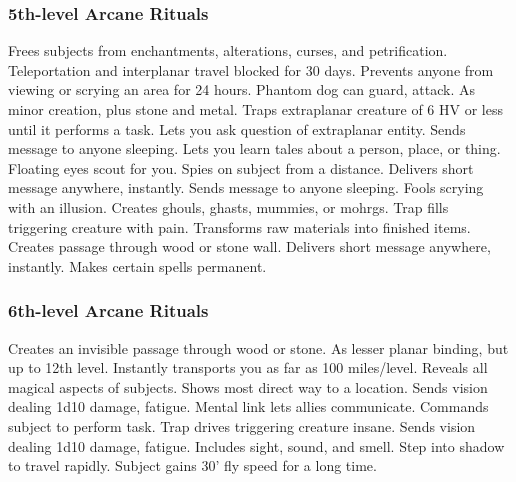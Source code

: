 \subsubsection{5th-level Arcane Rituals}
\begin{rituallist}
     Frees subjects from enchantments, alterations, curses, and petrification.
     Teleportation and interplanar travel blocked for 30 days.
     Prevents anyone from viewing or scrying an area for 24 hours.
     Phantom dog can guard, attack.
     As minor creation, plus stone and metal.
     Traps extraplanar creature of 6 HV or less until it performs a task.
     Lets you ask question of extraplanar entity.
     Sends message to anyone sleeping.
    \F Lets you learn tales about a person, place, or thing.
     Floating eyes scout for you.
    \F Spies on subject from a distance.
     Delivers short message anywhere, instantly.
     Sends message to anyone sleeping.
     Fools scrying with an illusion.
     Creates ghouls, ghasts, mummies, or mohrgs.
     Trap fills triggering creature with pain.
     Transforms raw materials into finished items.
     Creates passage through wood or stone wall.
     Delivers short message anywhere, instantly.
     Makes certain spells permanent.
\end{rituallist}

\subsubsection{6th-level Arcane Rituals}
\begin{rituallist}
     Creates an invisible passage through wood or stone.
     As lesser planar binding, but up to 12th level.
     Instantly transports you as far as 100 miles/level.
      Reveals all magical aspects of subjects.
     Shows most direct way to a location.
     Sends vision dealing 1d10 damage, fatigue.
     Mental link lets allies communicate.
     Commands subject to perform task.
     Trap drives triggering creature insane.
     Sends vision dealing 1d10 damage, fatigue.
     Includes sight, sound, and smell.
     Step into shadow to travel rapidly.
     Subject gains 30' fly speed for a long time.
\end{rituallist}

